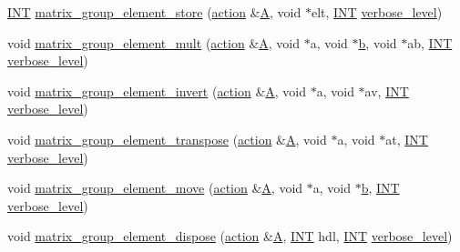 \begin{DoxyCompactItemize}
\mbox{\hyperlink{galois_8h_a09fddde158a3a20bd2dcadb609de11dc}{I\+NT}} \mbox{\hyperlink{interface__matrix__group_8_c_a022239b4366d52af91901716d626b518}{matrix\+\_\+group\+\_\+element\+\_\+store}} (\mbox{\hyperlink{classaction}{action}} \&\mbox{\hyperlink{simeon_8_c_a97833f04c3a9c008df5521a2fc291bb4}{A}}, void $\ast$elt, \mbox{\hyperlink{galois_8h_a09fddde158a3a20bd2dcadb609de11dc}{I\+NT}} \mbox{\hyperlink{simeon_8_c_a818073fbcc2f439e7c56952f67386122}{verbose\+\_\+level}})
\item 
void \mbox{\hyperlink{interface__matrix__group_8_c_ad887a3f020f1e4be419c39ae210ef16f}{matrix\+\_\+group\+\_\+element\+\_\+mult}} (\mbox{\hyperlink{classaction}{action}} \&\mbox{\hyperlink{simeon_8_c_a97833f04c3a9c008df5521a2fc291bb4}{A}}, void $\ast$a, void $\ast$\mbox{\hyperlink{alphabet2_8_c_a148e3876077787926724625411d6e7a9}{b}}, void $\ast$ab, \mbox{\hyperlink{galois_8h_a09fddde158a3a20bd2dcadb609de11dc}{I\+NT}} \mbox{\hyperlink{simeon_8_c_a818073fbcc2f439e7c56952f67386122}{verbose\+\_\+level}})
\item 
void \mbox{\hyperlink{interface__matrix__group_8_c_a7b91b9be761ab433dc1979fba0ff4885}{matrix\+\_\+group\+\_\+element\+\_\+invert}} (\mbox{\hyperlink{classaction}{action}} \&\mbox{\hyperlink{simeon_8_c_a97833f04c3a9c008df5521a2fc291bb4}{A}}, void $\ast$a, void $\ast$av, \mbox{\hyperlink{galois_8h_a09fddde158a3a20bd2dcadb609de11dc}{I\+NT}} \mbox{\hyperlink{simeon_8_c_a818073fbcc2f439e7c56952f67386122}{verbose\+\_\+level}})
\item 
void \mbox{\hyperlink{interface__matrix__group_8_c_aaf36ae3e69210e41138ede347ca87e17}{matrix\+\_\+group\+\_\+element\+\_\+transpose}} (\mbox{\hyperlink{classaction}{action}} \&\mbox{\hyperlink{simeon_8_c_a97833f04c3a9c008df5521a2fc291bb4}{A}}, void $\ast$a, void $\ast$at, \mbox{\hyperlink{galois_8h_a09fddde158a3a20bd2dcadb609de11dc}{I\+NT}} \mbox{\hyperlink{simeon_8_c_a818073fbcc2f439e7c56952f67386122}{verbose\+\_\+level}})
\item 
void \mbox{\hyperlink{interface__matrix__group_8_c_aee11a8631b44de7c6e8f8883f905d4ba}{matrix\+\_\+group\+\_\+element\+\_\+move}} (\mbox{\hyperlink{classaction}{action}} \&\mbox{\hyperlink{simeon_8_c_a97833f04c3a9c008df5521a2fc291bb4}{A}}, void $\ast$a, void $\ast$\mbox{\hyperlink{alphabet2_8_c_a148e3876077787926724625411d6e7a9}{b}}, \mbox{\hyperlink{galois_8h_a09fddde158a3a20bd2dcadb609de11dc}{I\+NT}} \mbox{\hyperlink{simeon_8_c_a818073fbcc2f439e7c56952f67386122}{verbose\+\_\+level}})
\item 
void \mbox{\hyperlink{interface__matrix__group_8_c_a28120d2087dc07bb997d1aa89319f8fc}{matrix\+\_\+group\+\_\+element\+\_\+dispose}} (\mbox{\hyperlink{classaction}{action}} \&\mbox{\hyperlink{simeon_8_c_a97833f04c3a9c008df5521a2fc291bb4}{A}}, \mbox{\hyperlink{galois_8h_a09fddde158a3a20bd2dcadb609de11dc}{I\+NT}} hdl, \mbox{\hyperlink{galois_8h_a09fddde158a3a20bd2dcadb609de11dc}{I\+NT}} \mbox{\hyperlink{simeon_8_c_a818073fbcc2f439e7c56952f67386122}{verbose\+\_\+level}})

\end{DoxyCompactItemize}
